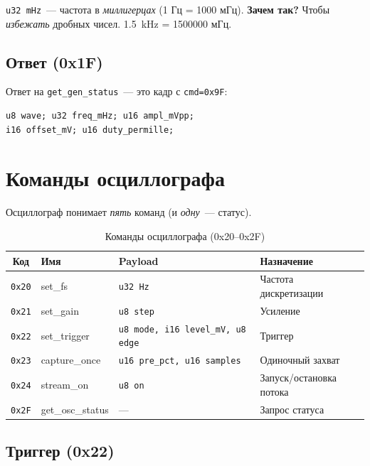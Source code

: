\texttt{u32 mHz}~--- частота в \emph{миллигерцах}
(1 Гц = 1000 мГц). \textbf{Зачем так?} Чтобы \emph{избежать}
дробных чисел. \SI{1.5}{\kilo\hertz} = \num{1500000} мГц.

\subsection{Ответ (0x1F)}

Ответ на \texttt{get\_gen\_status}~--- это кадр с \texttt{cmd=0x9F}:

\begin{verbatim}
u8 wave; u32 freq_mHz; u16 ampl_mVpp;
i16 offset_mV; u16 duty_permille;
\end{verbatim}

\section{Команды осциллографа}
\label{sec:protocol-osc-cmds}

Осциллограф понимает \emph{пять} команд (и \emph{одну}~--- статус).

\begin{table}[htbp]
\centering
\caption{Команды осциллографа (0x20–0x2F)}
\label{tab:protocol-osc-cmds}
\small
\begin{tabularx}{\textwidth}{@{}c l l L@{}}
\toprule
\textbf{Код} & \textbf{Имя} & \textbf{Payload} & \textbf{Назначение} \\
\midrule
\texttt{0x20} & set\_fs      & \texttt{u32 Hz} & Частота дискретизации \\
\texttt{0x21} & set\_gain    & \texttt{u8 step} & Усиление \\
\texttt{0x22} & set\_trigger & \texttt{u8 mode, i16 level\_mV, u8 edge} & Триггер \\
\texttt{0x23} & capture\_once & \texttt{u16 pre\_pct, u16 samples} & Одиночный захват \\
\texttt{0x24} & stream\_on   & \texttt{u8 on} & Запуск/остановка потока \\
\texttt{0x2F} & get\_osc\_status & --- & Запрос статуса \\
\bottomrule
\end{tabularx}
\end{table}

\subsection{Триггер (0x22)}

